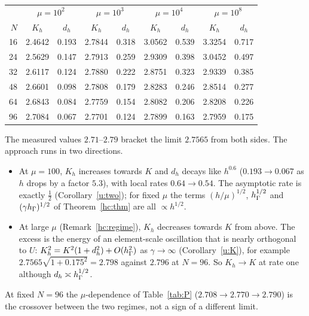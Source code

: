 \begin{center}\small
\begin{tabular}{r|cc|cc|cc|cc}
\toprule
 & \multicolumn{2}{c|}{$\mu=10^2$} & \multicolumn{2}{c|}{$\mu=10^3$} & \multicolumn{2}{c|}{$\mu=10^4$} & \multicolumn{2}{c}{$\mu=10^8$}\\
$N$ & $K_h$ & $d_h$ & $K_h$ & $d_h$ & $K_h$ & $d_h$ & $K_h$ & $d_h$\\
\midrule
16 & 2.4642 & 0.193 & 2.7844 & 0.318 & 3.0562 & 0.539 & 3.3254 & 0.717\\
24 & 2.5629 & 0.147 & 2.7913 & 0.259 & 2.9309 & 0.398 & 3.0452 & 0.497\\
32 & 2.6117 & 0.124 & 2.7880 & 0.222 & 2.8751 & 0.323 & 2.9339 & 0.385\\
48 & 2.6601 & 0.098 & 2.7808 & 0.179 & 2.8283 & 0.246 & 2.8514 & 0.277\\
64 & 2.6843 & 0.084 & 2.7759 & 0.154 & 2.8082 & 0.206 & 2.8208 & 0.226\\
96 & 2.7084 & 0.067 & 2.7701 & 0.124 & 2.7899 & 0.163 & 2.7959 & 0.175\\
\bottomrule
\end{tabular}
\end{center}

The measured values $2.71$--$2.79$ bracket the limit $2.7565$ from both sides. The approach runs in two directions.
\begin{itemize}
\item At $\mu=100$, $K_h$ increases towards $K$ and $d_h$ decays like $h^{0.6}$ ($0.193\to0.067$ as $h$ drops by a factor $5.3$), with local rates $0.64\to0.54$.
The asymptotic rate is exactly $\frac12$ (Corollary~\ref{u:two}); for fixed $\mu$ the terms $(h/\mu)^{1/2}$, $h_\Gamma^{1/2}$ and $(\gamma h_\Gamma)^{1/2}$ of Theorem~\ref{hc:thm} are all $\propto h^{1/2}$.
\item At large $\mu$ (Remark~\ref{hc:regime}), $K_h$ decreases towards $K$ from above. The excess is the energy of an
element-scale oscillation that is nearly orthogonal to $U$: $K_h^2=K^2(1+d_h^2)+O(h_\Gamma^2)$ as $\gamma\to\infty$ (Corollary~\ref{u:K}), for example $2.7565\sqrt{1+0.175^2}=2.798$
against $2.796$ at $N=96$. So $K_h\to K$ at rate one although $d_h\asymp h_\Gamma^{1/2}$.
\end{itemize}
At fixed $N=96$ the $\mu$-dependence of Table~\ref{tab:P} ($2.708\to2.770\to2.790$) is the crossover between the two regimes,
not a sign of a different limit.

